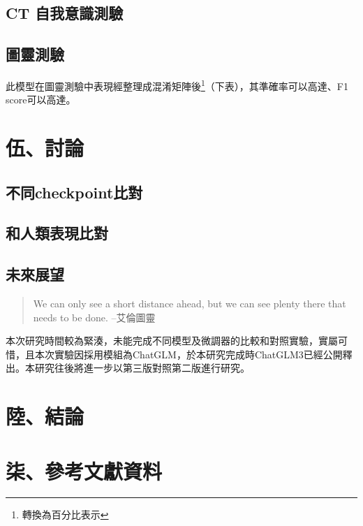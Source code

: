 \documentclass[8pt,a4paper,新細明體,UTF8,natbib]{article}
\begin{document}
\begin{CJK*}{UTF8}{bsmi}
	\subsection{CT 自我意識測驗}
	\subsection{圖靈測驗}
	此模型在圖靈測驗中表現經整理成混淆矩陣後\footnote{轉換為百分比表示}（下表），其準確率可以高達、F1 score可以高達。
	
	\section{伍、討論}
	\subsection{不同checkpoint比對}
	\subsection{和人類表現比對}
	\subsection{未來展望}
	\begin{quote}
		We can only see a short distance ahead, but we can see plenty there that needs to be done.	--艾倫圖靈
	\end{quote}
	本次研究時間較為緊湊，未能完成不同模型及微調器的比較和對照實驗，實屬可惜，且本次實驗因採用模組為ChatGLM，於本研究完成時ChatGLM3已經公開釋出。本研究往後將進一步以第三版對照第二版進行研究。
	\section{陸、結論}

	\section{柒、參考文獻資料}

\renewcommand{\refname}{}

\end{CJK*}
\end{document}
